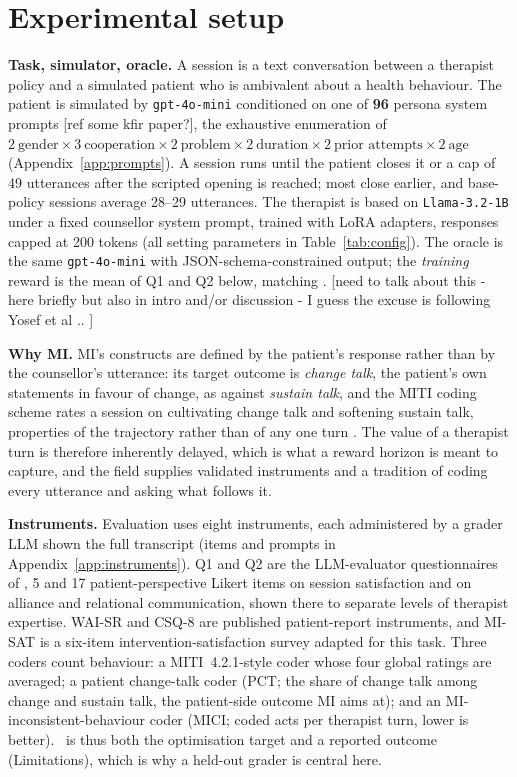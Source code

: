 \section{Experimental setup}
\label{sec:setup}

\textbf{Task, simulator, oracle.} A session is a text conversation between a therapist policy and
a simulated patient who is ambivalent about a health behaviour. The patient is simulated by
\texttt{gpt-4o-mini} conditioned on one of \textbf{96} persona system prompts [ref some kfir paper?], the exhaustive
enumeration of $2\ \text{gender} \times 3\ \text{cooperation} \times 2\ \text{problem} \times
2\ \text{duration} \times 2\ \text{prior attempts} \times 2\ \text{age}$
(Appendix~\ref{app:prompts}). A session runs until the patient closes it or a cap of 49 utterances
after the scripted opening is reached; most close earlier, and base-policy sessions average 28--29
utterances. The therapist is based on \texttt{Llama-3.2-1B} under a fixed counsellor system prompt,
trained with LoRA adapters, responses capped at 200 tokens (all setting parameters in
Table~\ref{tab:config}). The oracle is the same \texttt{gpt-4o-mini} with JSON-schema-constrained
output; the \emph{training} reward is the mean of Q1 and Q2 below, matching \citet{baruch2025pto}. [need to talk about this - here briefly but also in intro and/or discussion - I guess the excuse is following Yosef et al .. ]

\textbf{Why MI.} MI's constructs are defined by the patient's response rather than by the
counsellor's utterance: its target outcome is \emph{change talk}, the patient's own statements in
favour of change, as against \emph{sustain talk}, and the MITI coding scheme rates a session on
cultivating change talk and softening sustain talk, properties of the trajectory
rather than of any one turn \citep{miller2013mi, moyers2016miti}. The value of a therapist turn is
therefore inherently delayed, which is what a reward horizon is meant to capture, and the field
supplies validated instruments and a tradition of coding every utterance and asking what follows
it.

\textbf{Instruments.} Evaluation uses eight instruments, each administered by a grader LLM shown
the full transcript (items and prompts in Appendix~\ref{app:instruments}). Q1 and Q2 are the
LLM-evaluator questionnaires of \citet{yosef2024assessing}, 5 and 17 patient-perspective Likert
items on session satisfaction and on alliance and relational communication, shown there to
separate levels of therapist expertise. WAI-SR \citep{hatcher2006waisr} and
CSQ-8 \citep{larsen1979csq} are published patient-report instruments, and MI-SAT is a six-item
intervention-satisfaction survey adapted for this task. Three coders count behaviour: a
MITI~4.2.1-style coder \citep{moyers2016miti} whose four global ratings are averaged; a patient
change-talk coder (PCT; the share of change talk among change and sustain talk, the patient-side
outcome MI aims at); and an MI-inconsistent-behaviour coder (MICI; coded acts per therapist turn,
lower is better). \QQ\ is thus both the optimisation target and a reported outcome
(Limitations), which is why a held-out grader is central here.

